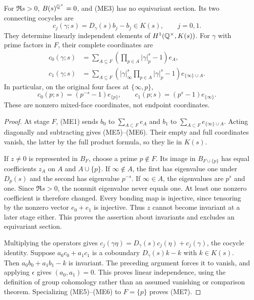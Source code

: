 \begin{theorem}
\label{thm:ME-extension}
For $\Re s>0$, $B(s)^{\mathbb Q^\times}=0$, and (ME3) has no equivariant
section. Its two connecting cocycles are
\[
 c_j(\gamma;s)=D_\gamma(s)b_j-b_j\in K(s),\qquad j=0,1.
 \tag{ME4}
\]
They determine linearly independent elements of
$H^1(\mathbb Q^\times,K(s))$. For $\gamma$ with prime factors in $F$, their
complete coordinates are
\begin{align}
 c_0(\gamma;s)&=
 \sum_{A\subseteq F}
 \left(\prod_{p\in A}|\gamma|_p^s-1\right)e_A,\tag{ME5}\\
 c_1(\gamma;s)&=
 \sum_{A\subseteq F}
 \left(|\gamma|_\infty^s\prod_{p\in A}|\gamma|_p^s-1\right)
 e_{\{\infty\}\cup A}.\tag{ME6}
\end{align}
In particular, on the original four faces at $\{\infty,p\}$,
\[
 c_0(p;s)=(p^{-s}-1)e_{\{p\}},\qquad
 c_1(p;s)=(p^s-1)e_{\{\infty\}}.
 \tag{ME7}\label{eq:ME-local-cocycle}
\]
These are nonzero mixed-face coordinates, not endpoint coordinates.
\end{theorem}
\begin{proof}
At stage $F$, (ME1) sends $b_0$ to $\sum_{A\subset F}e_A$ and
$b_1$ to $\sum_{A\subset F}e_{\{\infty\}\cup A}$. Acting diagonally
and subtracting gives (ME5)--(ME6). Their empty and full coordinates vanish,
the latter by the full product formula, so they lie in $K(s)$.

If $z\ne0$ is represented in $B_F$, choose a prime $p\notin F$.
Its image in $B_{F\cup\{p\}}$ has equal coefficients $z_A$ on $A$
and $A\cup\{p\}$. If $\infty\notin A$, the first has eigenvalue one
under $D_p(s)$ and the second has eigenvalue $p^{-s}$. If
$\infty\in A$, the eigenvalues are $p^s$ and one. Since $\Re s>0$,
the nonunit eigenvalue never equals one. At least one nonzero coefficient
is therefore changed. Every bonding map is injective, since tensoring by
the nonzero vector $e_0+e_1$ is injective. Thus $z$ cannot become invariant
at a later stage either. This proves the assertion about invariants and
excludes an equivariant section.

Multiplying the operators gives
$c_j(\gamma\eta)=D_\gamma(s)c_j(\eta)+c_j(\gamma)$, the cocycle
identity. Suppose $a_0c_0+a_1c_1$ is a coboundary
$D_\gamma(s)k-k$ with $k\in K(s)$. Then
$a_0b_0+a_1b_1-k$ is invariant. The preceding argument forces it to
vanish, and applying $\epsilon$ gives $(a_0,a_1)=0$.
This proves linear independence, using the definition of group
cohomology rather than an assumed vanishing or comparison theorem.
Specializing (ME5)--(ME6) to $F=\{p\}$ proves (ME7).
\end{proof}

